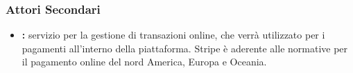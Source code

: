 \subsubsection{Attori Secondari}
\begin{itemize}
\item \textbf{:} servizio per la gestione di transazioni online, che verrà utilizzato per i pagamenti all'interno della piattaforma. Stripe è aderente alle normative per il pagamento online del nord America, Europa e Oceania.
\end{itemize}